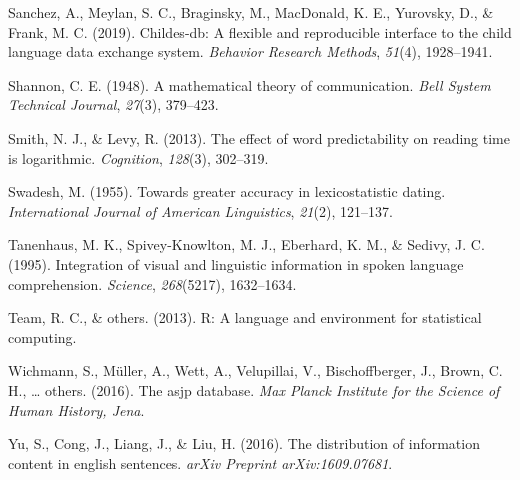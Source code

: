 \documentclass[man,floatsintext]{apa6}
\begin{document}
\leavevmode\hypertarget{ref-sanchez2019}{}%
Sanchez, A., Meylan, S. C., Braginsky, M., MacDonald, K. E., Yurovsky, D., \& Frank, M. C. (2019). Childes-db: A flexible and reproducible interface to the child language data exchange system. \emph{Behavior Research Methods}, \emph{51}(4), 1928--1941.

\leavevmode\hypertarget{ref-shannon1948}{}%
Shannon, C. E. (1948). A mathematical theory of communication. \emph{Bell System Technical Journal}, \emph{27}(3), 379--423.

\leavevmode\hypertarget{ref-smith2013}{}%
Smith, N. J., \& Levy, R. (2013). The effect of word predictability on reading time is logarithmic. \emph{Cognition}, \emph{128}(3), 302--319.

\leavevmode\hypertarget{ref-swadesh1955}{}%
Swadesh, M. (1955). Towards greater accuracy in lexicostatistic dating. \emph{International Journal of American Linguistics}, \emph{21}(2), 121--137.

\leavevmode\hypertarget{ref-tanenhaus1995}{}%
Tanenhaus, M. K., Spivey-Knowlton, M. J., Eberhard, K. M., \& Sedivy, J. C. (1995). Integration of visual and linguistic information in spoken language comprehension. \emph{Science}, \emph{268}(5217), 1632--1634.

\leavevmode\hypertarget{ref-team2013}{}%
Team, R. C., \& others. (2013). R: A language and environment for statistical computing.

\leavevmode\hypertarget{ref-wichmann2016}{}%
Wichmann, S., Müller, A., Wett, A., Velupillai, V., Bischoffberger, J., Brown, C. H., \ldots{} others. (2016). The asjp database. \emph{Max Planck Institute for the Science of Human History, Jena}.

\leavevmode\hypertarget{ref-yu2016}{}%
Yu, S., Cong, J., Liang, J., \& Liu, H. (2016). The distribution of information content in english sentences. \emph{arXiv Preprint arXiv:1609.07681}.

\endgroup
\end{document}
